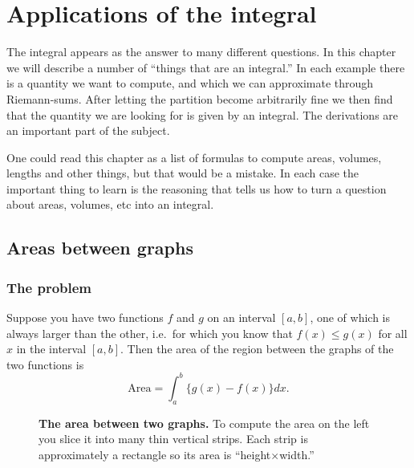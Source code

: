 \chapter{Applications of the integral}
The integral appears as the answer to many different questions.  In this chapter
we will describe a number of ``things that are an integral.''  In each example
there is a quantity we want to compute, and which we can approximate through
Riemann-sums.  After letting the partition become arbitrarily fine we then find
that the quantity we are looking for is given by an integral.  The derivations
are an important part of the subject.

One could read this chapter as a list of formulas to compute areas, volumes,
lengths and other things, but that would be a mistake.  In each case the
important thing to learn is the reasoning that tells us how to turn a question
about areas, volumes, etc into an integral.

\section{Areas between graphs}
\subsection{The problem}
Suppose you have two functions $f$ and $g$ on an interval $[a,b]$, one of which
is always larger than the other, i.e.\ for which you know that $f(x)\leq g(x)$
for all $x$ in the interval $[a,b]$.  Then the area of the region between the
graphs of the two functions is
\begin{equation}
  \label{eq:area-between-graphs}
  \textrm{Area} = \int_a^b \bigl\{g(x) - f(x) \bigr\} dx.
\end{equation}
\begin{figure}[h]
  \leftline{ 
     {\sffamily\footnotesize%
       } }
  
  \caption{\textbf{The area between two graphs. } %
    To compute the area on the left you slice it into many thin vertical strips.
    Each strip is approximately a rectangle so its area is
    ``height$\times$width.''  }

\end{figure}
